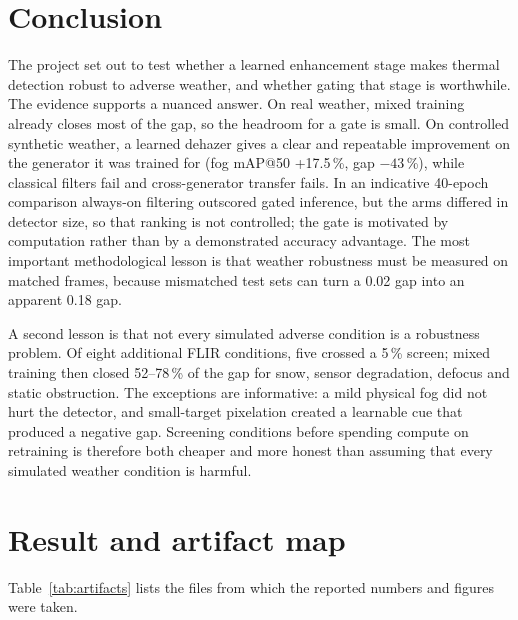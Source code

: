 \documentclass[11pt,a4paper]{article}
\begin{document}
\section{Conclusion}

The project set out to test whether a learned enhancement stage makes thermal
detection robust to adverse weather, and whether gating that stage is worthwhile.
The evidence supports a nuanced answer. On real weather, mixed training already
closes most of the gap, so the headroom for a gate is small. On controlled
synthetic weather, a learned dehazer gives a clear and repeatable improvement on
the generator it was trained for (fog mAP@50 +17.5\,\%, gap $-43$\,\%), while
classical filters fail and cross-generator transfer fails. In an indicative
40-epoch comparison always-on filtering outscored gated inference, but the arms
differed in detector size, so that ranking is not controlled; the gate is
motivated by computation rather than by a demonstrated accuracy advantage. The most important methodological lesson is that weather robustness
must be measured on matched frames, because mismatched test sets can turn a
0.02 gap into an apparent 0.18 gap.

A second lesson is that not every simulated adverse condition is a robustness
problem. Of eight additional FLIR conditions, five crossed a 5\,\% screen; mixed
training then closed 52--78\,\% of the gap for snow, sensor degradation, defocus
and static obstruction. The exceptions are informative: a mild physical fog did
not hurt the detector, and small-target pixelation created a learnable cue that
produced a negative gap. Screening conditions before spending compute on
retraining is therefore both cheaper and more honest than assuming that every
simulated weather condition is harmful.

\appendix
\section{Result and artifact map}
Table~\ref{tab:artifacts} lists the files from which the reported numbers and
figures were taken.
\end{document}
